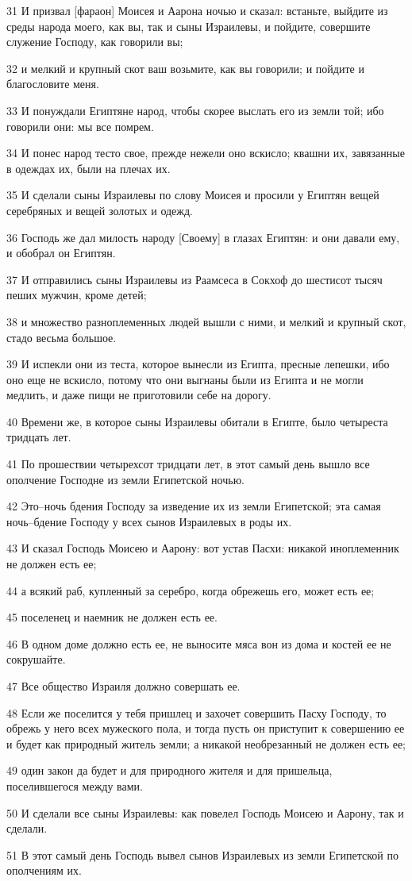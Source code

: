\par 31 И призвал [фараон] Моисея и Аарона ночью и сказал: встаньте, выйдите из среды народа моего, как вы, так и сыны Израилевы, и пойдите, совершите служение Господу, как говорили вы;
\par 32 и мелкий и крупный скот ваш возьмите, как вы говорили; и пойдите и благословите меня.
\par 33 И понуждали Египтяне народ, чтобы скорее выслать его из земли той; ибо говорили они: мы все помрем.
\par 34 И понес народ тесто свое, прежде нежели оно вскисло; квашни их, завязанные в одеждах их, были на плечах их.
\par 35 И сделали сыны Израилевы по слову Моисея и просили у Египтян вещей серебряных и вещей золотых и одежд.
\par 36 Господь же дал милость народу [Своему] в глазах Египтян: и они давали ему, и обобрал он Египтян.
\par 37 И отправились сыны Израилевы из Раамсеса в Сокхоф до шестисот тысяч пеших мужчин, кроме детей;
\par 38 и множество разноплеменных людей вышли с ними, и мелкий и крупный скот, стадо весьма большое.
\par 39 И испекли они из теста, которое вынесли из Египта, пресные лепешки, ибо оно еще не вскисло, потому что они выгнаны были из Египта и не могли медлить, и даже пищи не приготовили себе на дорогу.
\par 40 Времени же, в которое сыны Израилевы обитали в Египте, было четыреста тридцать лет.
\par 41 По прошествии четырехсот тридцати лет, в этот самый день вышло все ополчение Господне из земли Египетской ночью.
\par 42 Это--ночь бдения Господу за изведение их из земли Египетской; эта самая ночь--бдение Господу у всех сынов Израилевых в роды их.
\par 43 И сказал Господь Моисею и Аарону: вот устав Пасхи: никакой иноплеменник не должен есть ее;
\par 44 а всякий раб, купленный за серебро, когда обрежешь его, может есть ее;
\par 45 поселенец и наемник не должен есть ее.
\par 46 В одном доме должно есть ее, не выносите мяса вон из дома и костей ее не сокрушайте.
\par 47 Все общество Израиля должно совершать ее.
\par 48 Если же поселится у тебя пришлец и захочет совершить Пасху Господу, то обрежь у него всех мужеского пола, и тогда пусть он приступит к совершению ее и будет как природный житель земли; а никакой необрезанный не должен есть ее;
\par 49 один закон да будет и для природного жителя и для пришельца, поселившегося между вами.
\par 50 И сделали все сыны Израилевы: как повелел Господь Моисею и Аарону, так и сделали.
\par 51 В этот самый день Господь вывел сынов Израилевых из земли Египетской по ополчениям их.

